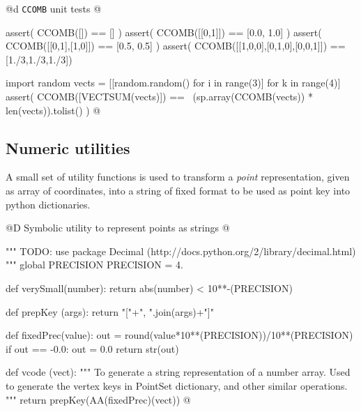 \documentclass[11pt,oneside]{article}    %
\begin{document}
@d \texttt{CCOMB} unit tests
@{assert( CCOMB([]) == [] )
assert( CCOMB([[0,1]]) == [0.0, 1.0] )
assert( CCOMB([[0,1],[1,0]]) == [0.5, 0.5] )
assert( CCOMB([[1,0,0],[0,1,0],[0,0,1]]) == [1./3,1./3,1./3])

import random
vects = [[random.random() for i in range(3)] for k in range(4)]
assert( CCOMB([VECTSUM(vects)]) == \
        (sp.array(CCOMB(vects)) * len(vects)).tolist() )
@}






\subsection{Numeric utilities}

A small set of utility functions is used to transform a \emph{point} representation, given as array of coordinates, into a string of fixed format to be used as point key into python dictionaries.

@D Symbolic utility to represent points as strings
@{""" TODO: use package Decimal (http://docs.python.org/2/library/decimal.html) """
global PRECISION
PRECISION = 4.

def verySmall(number): return abs(number) < 10**-(PRECISION)

def prepKey (args): return "["+", ".join(args)+"]"

def fixedPrec(value):
    out = round(value*10**(PRECISION))/10**(PRECISION)
    if out == -0.0: out = 0.0
    return str(out)
    
def vcode (vect): 
    """
    To generate a string representation of a number array.
    Used to generate the vertex keys in PointSet dictionary, and other similar operations.
    """
    return prepKey(AA(fixedPrec)(vect))
@}
\end{document}
